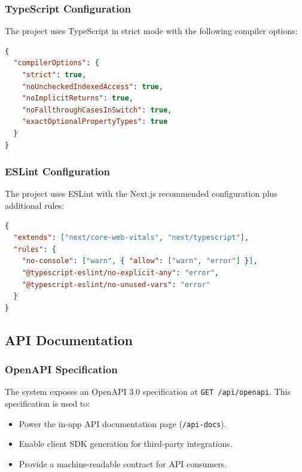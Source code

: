 \documentclass[12pt,onecolumn]{IEEEtran}
\begin{document}
\subsubsection{TypeScript Configuration}

The project uses TypeScript in strict mode with the following compiler options:

\begin{lstlisting}[language=JSON,caption={tsconfig.json strict settings}]
{
  "compilerOptions": {
    "strict": true,
    "noUncheckedIndexedAccess": true,
    "noImplicitReturns": true,
    "noFallthroughCasesInSwitch": true,
    "exactOptionalPropertyTypes": true
  }
}
\end{lstlisting}

\subsubsection{ESLint Configuration}

The project uses ESLint with the Next.js recommended configuration plus additional rules:

\begin{lstlisting}[language=JSON,caption={.eslintrc.json}]
{
  "extends": ["next/core-web-vitals", "next/typescript"],
  "rules": {
    "no-console": ["warn", { "allow": ["warn", "error"] }],
    "@typescript-eslint/no-explicit-any": "error",
    "@typescript-eslint/no-unused-vars": "error"
  }
}
\end{lstlisting}

\subsection{API Documentation}

\subsubsection{OpenAPI Specification}

The system exposes an OpenAPI 3.0 specification at \texttt{GET /api/openapi}. This specification is used to:
\begin{itemize}[leftmargin=1.5em]
  \item Power the in-app API documentation page (\texttt{/api-docs}).
  \item Enable client SDK generation for third-party integrations.
  \item Provide a machine-readable contract for API consumers.
\end{itemize}
\end{document}
